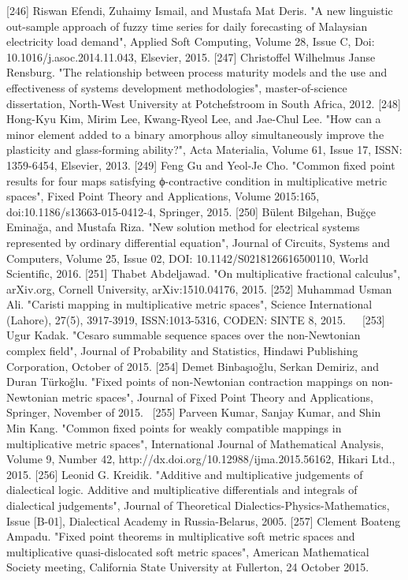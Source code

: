 \documentclass[12pt]{article}
\begin{document}
[246] Riswan Efendi, Zuhaimy Ismail, and Mustafa Mat Deris. "A new linguistic out-sample approach of fuzzy time series for daily forecasting of Malaysian electricity load demand", Applied Soft Computing, Volume 28, Issue C, Doi: 10.1016/j.asoc.2014.11.043, Elsevier, 2015.
[247] Christoffel Wilhelmus Janse Rensburg. "The relationship between process maturity models and the use and effectiveness of systems development methodologies", master-of-science dissertation, North-West University at Potchefstroom in South Africa, 2012.
[248] Hong-Kyu Kim, Mirim Lee, Kwang-Ryeol Lee, and Jae-Chul Lee. "How can a minor element added to a binary amorphous alloy simultaneously improve the plasticity and glass-forming ability?", Acta Materialia, Volume 61, Issue 17, ISSN: 1359-6454, Elsevier, 2013.
[249] Feng Gu and Yeol-Je Cho. "Common fixed point results for four maps satisfying ϕ-contractive condition in multiplicative metric spaces", Fixed Point Theory and Applications, Volume 2015:165,  doi:10.1186/s13663-015-0412-4, Springer, 2015.
[250] Bülent Bilgehan, Buğçe Eminağa, and Mustafa Riza. "New solution method for electrical systems represented by ordinary differential equation", Journal of Circuits, Systems and Computers, Volume 25, Issue 02, DOI: 10.1142/S0218126616500110, World Scientific, 2016.
[251] Thabet Abdeljawad. "On multiplicative fractional calculus", arXiv.org, Cornell University, arXiv:1510.04176, 2015.
[252] Muhammad Usman Ali. "Caristi mapping in multiplicative metric spaces", Science International (Lahore), 27(5), 3917-3919, ISSN:1013-5316, CODEN: SINTE 8, 2015.    [253] Ugur Kadak. "Cesaro summable sequence spaces over the non-Newtonian complex field", Journal of Probability and Statistics, Hindawi Publishing Corporation, October of 2015.
[254] Demet Binbaşıoǧlu, Serkan Demiriz, and Duran Türkoǧlu. "Fixed points of non-Newtonian contraction mappings on non-Newtonian metric spaces", Journal of Fixed Point Theory and Applications, Springer, November of 2015. 
[255] Parveen Kumar, Sanjay Kumar, and Shin Min Kang. "Common fixed points for weakly compatible mappings in multiplicative metric spaces", International Journal of Mathematical Analysis, Volume 9, Number 42, http://dx.doi.org/10.12988/ijma.2015.56162, Hikari Ltd., 2015.
[256] Leonid G. Kreidik. "Additive and multiplicative judgements of dialectical logic. Additive and multiplicative differentials and integrals of dialectical judgements", Journal of Theoretical Dialectics-Physics-Mathematics, Issue [B-01], Dialectical Academy in Russia-Belarus, 2005.
[257] Clement Boateng Ampadu. "Fixed point theorems in multiplicative soft metric spaces and multiplicative quasi-dislocated soft metric spaces", American Mathematical Society meeting, California State University at Fullerton, 24 October 2015.
\end{document}
